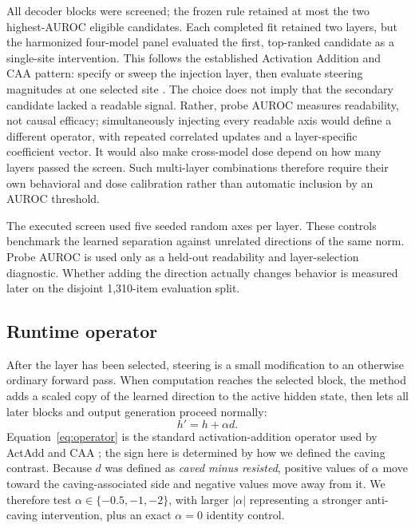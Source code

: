 \documentclass[11pt]{article}
\begin{document}
All decoder blocks were screened; the frozen rule retained at most the two
highest-AUROC eligible candidates. Each completed fit retained two layers, but
the harmonized four-model panel evaluated the first, top-ranked candidate as a
single-site intervention. This follows the established Activation Addition and
CAA pattern: specify or sweep the injection layer, then evaluate steering
magnitudes at one selected site
\citep{turner2023activation,panickssery2023caa}. The choice does not imply that
the secondary candidate lacked a readable signal. Rather, probe AUROC measures
readability, not causal efficacy; simultaneously injecting every readable axis
would define a different operator, with repeated correlated updates and a
layer-specific coefficient vector. It would also make cross-model dose depend
on how many layers passed the screen. Such multi-layer combinations therefore
require their own behavioral and dose calibration rather than automatic
inclusion by an AUROC threshold.

The executed screen used five seeded random axes per layer. These controls
benchmark the learned separation against unrelated directions of the same norm.
Probe AUROC is used only as a held-out readability and layer-selection
diagnostic. Whether adding the direction actually changes behavior is measured
later on the disjoint 1,310-item evaluation split.

\subsection{Runtime operator}

After the layer has been selected, steering is a small modification to an
otherwise ordinary forward pass. When computation reaches the selected block,
the method adds a scaled copy of the learned direction to the active hidden
state, then lets all later blocks and output generation proceed normally:
\begin{equation}
  h' = h + \alpha d.
  \label{eq:operator}
\end{equation}
Equation~\ref{eq:operator} is the standard activation-addition operator used by
ActAdd and CAA \citep{turner2023activation,panickssery2023caa}; the sign here is
determined by how we defined the caving contrast.
Because $d$ was defined as \emph{caved minus resisted}, positive values of
$\alpha$ move toward the caving-associated side and negative values move away
from it. We therefore test $\alpha\in\{-0.5,-1,-2\}$, with larger $|\alpha|$
representing a stronger anti-caving intervention, plus an exact $\alpha=0$
identity control.
\end{document}
